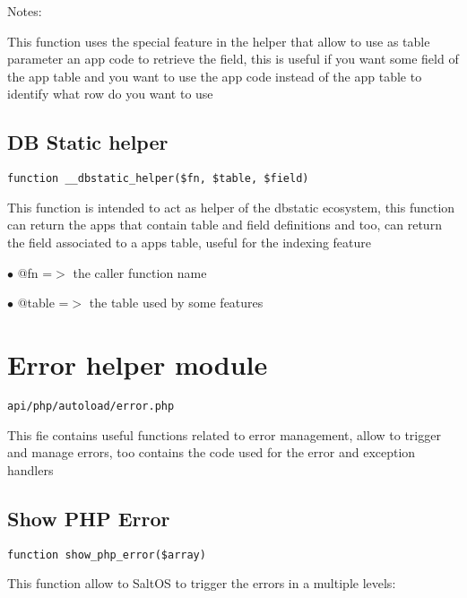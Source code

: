 \documentclass[a4paper]{book}
\begin{document}
Notes:

This function uses the special feature in the helper that allow to
use as table parameter an app code to retrieve the field, this is
useful if you want some field of the app table and you want to use
the app code instead of the app table to identify what row do you
want to use

\hypertarget{toc103}{}
\subsection{DB Static helper}

\begin{lstlisting}
function __dbstatic_helper($fn, $table, $field)
\end{lstlisting}

This function is intended to act as helper of the dbstatic ecosystem, this
function can return the apps that contain table and field definitions and
too, can return the field associated to a apps table, useful for the
indexing feature

\begin{compactitem}
\item[\color{myblue}$\bullet$] @fn    =$>$ the caller function name
\item[\color{myblue}$\bullet$] @table =$>$ the table used by some features
\end{compactitem}

\hypertarget{toc104}{}
\section{Error helper module}

\begin{lstlisting}
api/php/autoload/error.php
\end{lstlisting}

This fie contains useful functions related to error management, allow to trigger and manage
errors, too contains the code used for the error and exception handlers

\hypertarget{toc105}{}
\subsection{Show PHP Error}

\begin{lstlisting}
function show_php_error($array)
\end{lstlisting}

This function allow to SaltOS to trigger the errors in a multiple levels:
\end{document}

